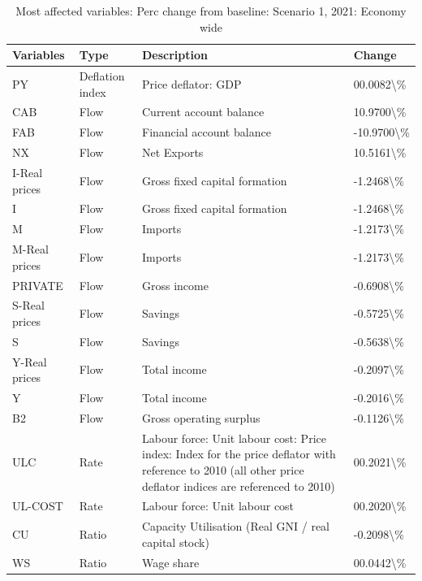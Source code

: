 \documentclass[
]{book}
\begin{document}
\begin{table}

\caption{\label{tab:most-affected-scenario-1-perc-2020-economy}Most affected variables: Perc change from baseline: Scenario 1, 2021: Economy wide}
\centering
\fontsize{10}{12}\selectfont
\begin{tabular}[t]{l|l|l|l}
\hline
Variables & Type & Description & Change\\
\hline
PY & Deflation index & Price deflator: GDP & 00.0082\textbackslash{}\%\\
\hline
CAB & Flow & Current account balance & 10.9700\textbackslash{}\%\\
\hline
FAB & Flow & Financial account balance & -10.9700\textbackslash{}\%\\
\hline
NX & Flow & Net Exports & 10.5161\textbackslash{}\%\\
\hline
I-Real prices & Flow & Gross fixed capital formation & -1.2468\textbackslash{}\%\\
\hline
I & Flow & Gross fixed capital formation & -1.2468\textbackslash{}\%\\
\hline
M & Flow & Imports & -1.2173\textbackslash{}\%\\
\hline
M-Real prices & Flow & Imports & -1.2173\textbackslash{}\%\\
\hline
PRIVATE & Flow & Gross income & -0.6908\textbackslash{}\%\\
\hline
S-Real prices & Flow & Savings & -0.5725\textbackslash{}\%\\
\hline
S & Flow & Savings & -0.5638\textbackslash{}\%\\
\hline
Y-Real prices & Flow & Total income & -0.2097\textbackslash{}\%\\
\hline
Y & Flow & Total income & -0.2016\textbackslash{}\%\\
\hline
B2 & Flow & Gross operating surplus & -0.1126\textbackslash{}\%\\
\hline
ULC & Rate & Labour force: Unit labour cost: Price index: Index for the price deflator with reference to 2010 (all other price deflator indices are referenced to 2010) & 00.2021\textbackslash{}\%\\
\hline
UL-COST & Rate & Labour force: Unit labour cost & 00.2020\textbackslash{}\%\\
\hline
CU & Ratio & Capacity Utilisation (Real GNI  /  real capital stock) & -0.2098\textbackslash{}\%\\
\hline
WS & Ratio & Wage share & 00.0442\textbackslash{}\%\\
\hline
\end{tabular}
\end{table}
\end{document}
